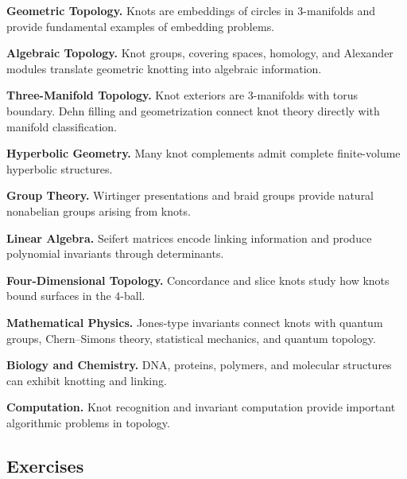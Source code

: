 \begin{applicationbox}
\textbf{Geometric Topology.}
Knots are embeddings of circles in \(3\)-manifolds and provide fundamental
examples of embedding problems.

\medskip

\textbf{Algebraic Topology.}
Knot groups, covering spaces, homology, and Alexander modules translate
geometric knotting into algebraic information.

\medskip

\textbf{Three-Manifold Topology.}
Knot exteriors are \(3\)-manifolds with torus boundary. Dehn filling and
geometrization connect knot theory directly with manifold classification.

\medskip

\textbf{Hyperbolic Geometry.}
Many knot complements admit complete finite-volume hyperbolic structures.

\medskip

\textbf{Group Theory.}
Wirtinger presentations and braid groups provide natural nonabelian groups
arising from knots.

\medskip

\textbf{Linear Algebra.}
Seifert matrices encode linking information and produce polynomial
invariants through determinants.

\medskip

\textbf{Four-Dimensional Topology.}
Concordance and slice knots study how knots bound surfaces in the \(4\)-ball.

\medskip

\textbf{Mathematical Physics.}
Jones-type invariants connect knots with quantum groups, Chern--Simons
theory, statistical mechanics, and quantum topology.

\medskip

\textbf{Biology and Chemistry.}
DNA, proteins, polymers, and molecular structures can exhibit knotting and
linking.

\medskip

\textbf{Computation.}
Knot recognition and invariant computation provide important algorithmic
problems in topology.
\end{applicationbox}

\subsection{Exercises}
\label{subsec:knot-theory-exercises}

